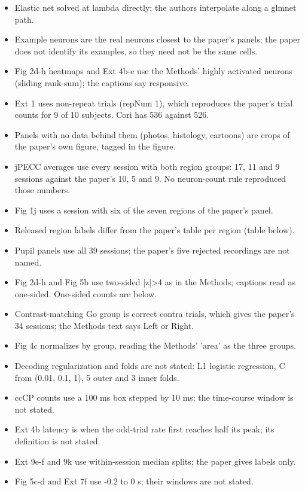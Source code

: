 \begin{itemize}
\item Elastic net solved at lambda directly; the authors interpolate along a glmnet path.
\item Example neurons are the real neurons closest to the paper's panels; the paper does not identify its examples, so they need not be the same cells.
\item Fig 2d-h heatmaps and Ext 4b-e use the Methods' highly activated neurons (sliding rank-sum); the captions say responsive.
\item Ext 1 uses non-repeat trials (repNum 1), which reproduces the paper's trial counts for 9 of 10 subjects. Cori has 536 against 526.
\item Panels with no data behind them (photos, histology, cartoons) are crops of the paper's own figure, tagged in the figure.
\item jPECC averages use every session with both region groups: 17, 11 and 9 sessions against the paper's 10, 5 and 9. No neuron-count rule reproduced those numbers.
\item Fig 1j uses a session with six of the seven regions of the paper's panel.
\item Released region labels differ from the paper's table per region (table below).
\item Pupil panels use all 39 sessions; the paper's five rejected recordings are not named.
\item Fig 2d-h and Fig 5b use two-sided |z|>4 as in the Methods; captions read as one-sided. One-sided counts are below.
\item Contrast-matching Go group is correct contra trials, which gives the paper's 34 sessions; the Methods text says Left or Right.
\item Fig 4c normalizes by group, reading the Methods' 'area' as the three groups.
\item Decoding regularization and folds are not stated: L1 logistic regression, C from (0.01, 0.1, 1), 5 outer and 3 inner folds.
\item ccCP counts use a 100 ms box stepped by 10 ms; the time-course window is not stated.
\item Ext 4b latency is when the odd-trial rate first reaches half its peak; its definition is not stated.
\item Ext 9e-f and 9k use within-session median splits; the paper gives labels only.
\item Fig 5c-d and Ext 7f use -0.2 to 0 s; their windows are not stated.

\end{itemize}
